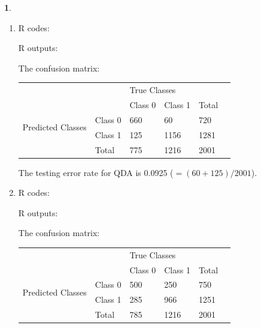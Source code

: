 \documentclass[10pt]{article}
\newtheorem{prob}{\bm{$Problem$}}
\begin{document}
\begin{prob}
\end{prob}
\begin{enumerate}[1)]
\vspace{3mm}

\item
R codes:

\vspace{3mm}
R outputs:

\vspace{3mm}
The confusion matrix:\\
\begin{tabular}{llllll}
                                          &         & \multicolumn{2}{l}{True Classes}        &       &  \\
                                          &         & Class 0           & Class 1            & Total &  \\
\multirow{2}{*}{Predicted Classes}        & Class 0 & 660               & 60                 & 720   &  \\
                                          & Class 1 & 125               & 1156               & 1281  &  \\
                                          & Total   & 775               & 1216               & 2001  &
\end{tabular}
\vspace{3mm}

The testing error rate for QDA is 0.0925 ($=(60+125)/2001$).
\vspace{3mm}

\item
R codes:

\vspace{3mm}
R outputs:

\vspace{3mm}
The confusion matrix:\\
\begin{tabular}{llllll}
                                          &         & \multicolumn{2}{l}{True Classes}       &       &  \\
                                          &         & Class 0           & Class 1            & Total &  \\
\multirow{2}{*}{Predicted Classes}        & Class 0 & 500               & 250                & 750   &  \\
                                          & Class 1 & 285               & 966                & 1251  &  \\
                                          & Total   & 785               & 1216               & 2001  &
\end{tabular}
\vspace{3mm}


\end{enumerate}
\end{document}
